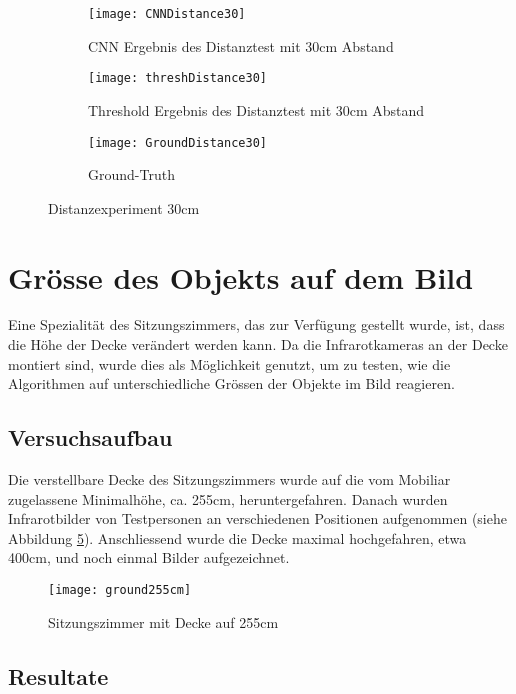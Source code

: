 \begin{figure}[H]
	\begin{subfigure}{.45\linewidth}
		\centering
		\texttt{[image: CNNDistance30]}
		\caption{\gls{CNN} Ergebnis des Distanztest mit 30cm Abstand}
		\label{fig:cnnDistance30}
	\end{subfigure}\hfill%
	\begin{subfigure}{.45\linewidth}
		\centering
		\texttt{[image: threshDistance30]}
		\caption{Threshold Ergebnis des Distanztest mit 30cm Abstand}
		\label{fig:thresholdDistance30}
	\end{subfigure}\hfill%
	\begin{subfigure}{\linewidth}
		\centering
		\texttt{[image: GroundDistance30]}
		\caption{Ground-Truth}
		\label{fig:groundDistance30}
	\end{subfigure}
	\caption{Distanzexperiment 30cm}
	\label{fig:Distance30}
\end{figure}

\section{Grösse des Objekts auf dem Bild}
\label{sec:objectSize}
Eine Spezialität des Sitzungszimmers, das zur Verfügung gestellt wurde, ist, dass die Höhe der Decke verändert werden kann. Da die Infrarotkameras an der Decke montiert sind, wurde dies als Möglichkeit genutzt, um zu testen, wie die Algorithmen auf unterschiedliche Grössen der Objekte im Bild reagieren.

\subsection{Versuchsaufbau}

Die verstellbare Decke des Sitzungszimmers wurde auf die vom Mobiliar zugelassene Minimalhöhe, ca. 255cm, heruntergefahren. Danach wurden Infrarotbilder von Testpersonen an verschiedenen Positionen aufgenommen (siehe Abbildung \ref{fig:ground255cm}). Anschliessend wurde die Decke maximal hochgefahren, etwa 400cm, und noch einmal Bilder aufgezeichnet.

\begin{figure}[H]
	\centering
	\texttt{[image: ground255cm]}
	\caption{Sitzungszimmer mit Decke auf 255cm}
	\label{fig:ground255cm}
\end{figure}

\subsection{Resultate}

